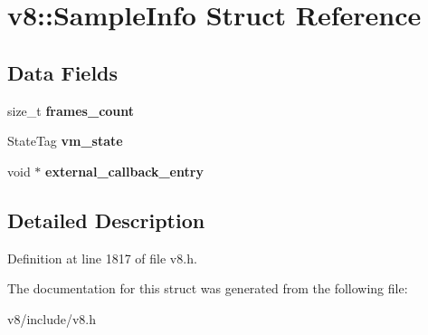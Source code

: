 \hypertarget{structv8_1_1SampleInfo}{}\section{v8\+:\+:Sample\+Info Struct Reference}
\label{structv8_1_1SampleInfo}
\subsection*{Data Fields}
\begin{DoxyCompactItemize}
\item 
\mbox{\label{structv8_1_1SampleInfo_a5f1e51bc358605e0c1d38fb2f3d344cd}} 
size\+\_\+t {\bfseries frames\+\_\+count}
\item 
\mbox{\label{structv8_1_1SampleInfo_afd6198c9feb44a8df79576cf427b9a91}} 
State\+Tag {\bfseries vm\+\_\+state}
\item 
\mbox{\label{structv8_1_1SampleInfo_ac18636e309f00c66a68a29d78eaf355a}} 
void $\ast$ {\bfseries external\+\_\+callback\+\_\+entry}
\end{DoxyCompactItemize}


\subsection{Detailed Description}


Definition at line 1817 of file v8.\+h.



The documentation for this struct was generated from the following file\+:\begin{DoxyCompactItemize}
\item 
v8/include/v8.\+h\end{DoxyCompactItemize}
